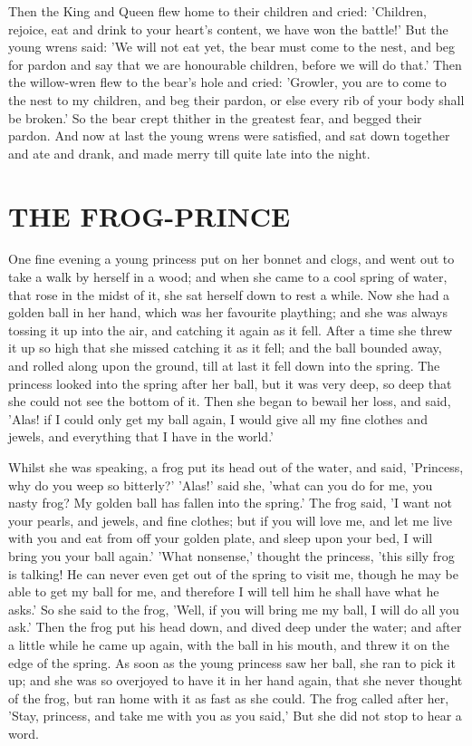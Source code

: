 \documentclass[12pt]{book}
\begin{document}
Then the King and Queen flew home to their children and cried:
'Children, rejoice, eat and drink to your heart's content, we have won
the battle!' But the young wrens said: 'We will not eat yet, the bear
must come to the nest, and beg for pardon and say that we are
honourable children, before we will do that.' Then the willow-wren
flew to the bear's hole and cried: 'Growler, you are to come to the
nest to my children, and beg their pardon, or else every rib of your
body shall be broken.' So the bear crept thither in the greatest fear,
and begged their pardon. And now at last the young wrens were
satisfied, and sat down together and ate and drank, and made merry
till quite late into the night.



\chapter{THE FROG-PRINCE}

One fine evening a young princess put on her bonnet and clogs, and
went out to take a walk by herself in a wood; and when she came to a
cool spring of water, that rose in the midst of it, she sat herself
down to rest a while. Now she had a golden ball in her hand, which was
her favourite plaything; and she was always tossing it up into the
air, and catching it again as it fell. After a time she threw it up so
high that she missed catching it as it fell; and the ball bounded
away, and rolled along upon the ground, till at last it fell down into
the spring. The princess looked into the spring after her ball, but it
was very deep, so deep that she could not see the bottom of it. Then
she began to bewail her loss, and said, 'Alas! if I could only get my
ball again, I would give all my fine clothes and jewels, and
everything that I have in the world.'

Whilst she was speaking, a frog put its head out of the water, and
said, 'Princess, why do you weep so bitterly?' 'Alas!' said she, 'what
can you do for me, you nasty frog? My golden ball has fallen into the
spring.' The frog said, 'I want not your pearls, and jewels, and fine
clothes; but if you will love me, and let me live with you and eat
from off your golden plate, and sleep upon your bed, I will bring you
your ball again.' 'What nonsense,' thought the princess, 'this silly
frog is talking! He can never even get out of the spring to visit me,
though he may be able to get my ball for me, and therefore I will tell
him he shall have what he asks.' So she said to the frog, 'Well, if
you will bring me my ball, I will do all you ask.' Then the frog put
his head down, and dived deep under the water; and after a little
while he came up again, with the ball in his mouth, and threw it on
the edge of the spring. As soon as the young princess saw her ball,
she ran to pick it up; and she was so overjoyed to have it in her hand
again, that she never thought of the frog, but ran home with it as
fast as she could. The frog called after her, 'Stay, princess, and
take me with you as you said,' But she did not stop to hear a word.
\end{document}
